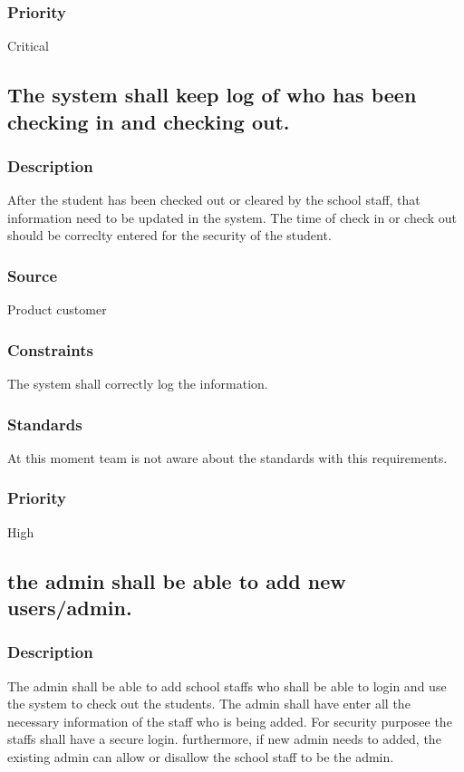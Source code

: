 \subsubsection{Priority}
Critical







\subsection{The system shall keep log of who has been checking in and checking out.}
\subsubsection{Description}
After the student has been checked out or cleared by the school staff, that information need to be updated in the system. The time of check in or check out should be correclty entered for the security of the student.
\subsubsection{Source}
Product customer
\subsubsection{Constraints}
The system shall correctly log the information.
\subsubsection{Standards}
At this moment team is not aware about the standards with this requirements.
\subsubsection{Priority}
High





\subsection{the admin shall be able to add new users/admin.}
\subsubsection{Description}
The admin shall be able to add school staffs who shall be able to login and use the system to check out the students. The admin shall have enter all the necessary information of the staff who is being added. For security purposee the staffs shall have a secure login. furthermore, if new admin needs to added, the existing admin can allow or disallow the school staff to be the admin. 
